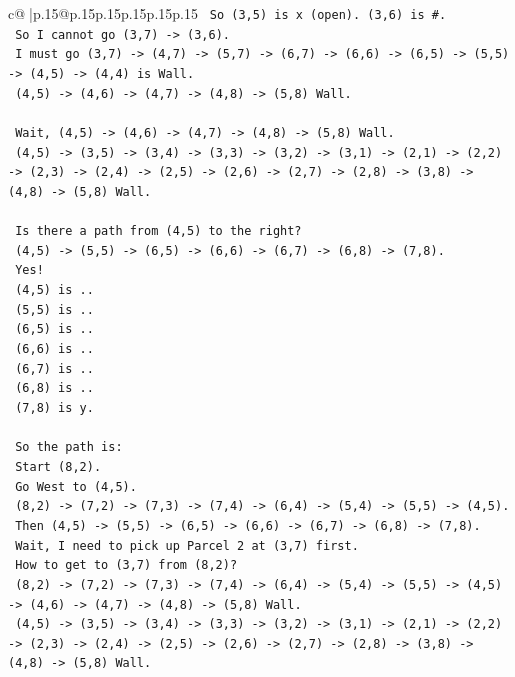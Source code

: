 \documentclass{article}
\begin{document}
{\begin{supertabular}{c@{$\;$}|p{.15\linewidth}@{}p{.15\linewidth}p{.15\linewidth}p{.15\linewidth}p{.15\linewidth}p{.15\linewidth}}
{{{\texttt{  So (3,5) is x (open). (3,6) is \#.} \\
\texttt{  So I cannot go (3,7) {-}> (3,6).} \\
\texttt{  I must go (3,7) {-}> (4,7) {-}> (5,7) {-}> (6,7) {-}> (6,6) {-}> (6,5) {-}> (5,5) {-}> (4,5) {-}> (4,4) is Wall.} \\
\texttt{  (4,5) {-}> (4,6) {-}> (4,7) {-}> (4,8) {-}> (5,8) Wall.} \\
\\ 
\texttt{  Wait, (4,5) {-}> (4,6) {-}> (4,7) {-}> (4,8) {-}> (5,8) Wall.} \\
\texttt{  (4,5) {-}> (3,5) {-}> (3,4) {-}> (3,3) {-}> (3,2) {-}> (3,1) {-}> (2,1) {-}> (2,2) {-}> (2,3) {-}> (2,4) {-}> (2,5) {-}> (2,6) {-}> (2,7) {-}> (2,8) {-}> (3,8) {-}> (4,8) {-}> (5,8) Wall.} \\
\\ 
\texttt{  Is there a path from (4,5) to the right?} \\
\texttt{  (4,5) {-}> (5,5) {-}> (6,5) {-}> (6,6) {-}> (6,7) {-}> (6,8) {-}> (7,8).} \\
\texttt{  Yes!} \\
\texttt{  (4,5) is ..} \\
\texttt{  (5,5) is ..} \\
\texttt{  (6,5) is ..} \\
\texttt{  (6,6) is ..} \\
\texttt{  (6,7) is ..} \\
\texttt{  (6,8) is ..} \\
\texttt{  (7,8) is y.} \\
\\ 
\texttt{  So the path is:} \\
\texttt{  Start (8,2).} \\
\texttt{  Go West to (4,5).} \\
\texttt{  (8,2) {-}> (7,2) {-}> (7,3) {-}> (7,4) {-}> (6,4) {-}> (5,4) {-}> (5,5) {-}> (4,5).} \\
\texttt{  Then (4,5) {-}> (5,5) {-}> (6,5) {-}> (6,6) {-}> (6,7) {-}> (6,8) {-}> (7,8).} \\
\texttt{  Wait, I need to pick up Parcel 2 at (3,7) first.} \\
\texttt{  How to get to (3,7) from (8,2)?} \\
\texttt{  (8,2) {-}> (7,2) {-}> (7,3) {-}> (7,4) {-}> (6,4) {-}> (5,4) {-}> (5,5) {-}> (4,5) {-}> (4,6) {-}> (4,7) {-}> (4,8) {-}> (5,8) Wall.} \\
\texttt{  (4,5) {-}> (3,5) {-}> (3,4) {-}> (3,3) {-}> (3,2) {-}> (3,1) {-}> (2,1) {-}> (2,2) {-}> (2,3) {-}> (2,4) {-}> (2,5) {-}> (2,6) {-}> (2,7) {-}> (2,8) {-}> (3,8) {-}> (4,8) {-}> (5,8) Wall.} \\
}}}
\end{supertabular}}
\end{document}
